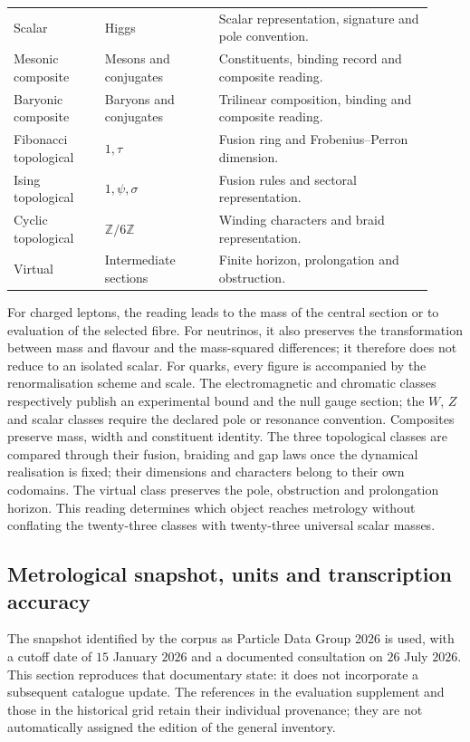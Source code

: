 \begin{longtable}{p{0.20\linewidth}p{0.25\linewidth}p{0.47\linewidth}}
Scalar & Higgs & Scalar representation, signature and pole convention.\\
Mesonic composite & Mesons and conjugates & Constituents, binding record and composite reading.\\
Baryonic composite & Baryons and conjugates & Trilinear composition, binding and composite reading.\\
Fibonacci topological & \(1,\tau\) & Fusion ring and Frobenius--Perron dimension.\\
Ising topological & \(1,\psi,\sigma\) & Fusion rules and sectoral representation.\\
Cyclic topological & \(\mathbb Z/6\mathbb Z\) & Winding characters and braid representation.\\
Virtual & Intermediate sections & Finite horizon, prolongation and obstruction.\\
\end{longtable}
\endgroup

For charged leptons, the reading leads to the mass of the central section
or to evaluation of the selected fibre. For neutrinos, it also preserves
the transformation between mass and flavour and the mass-squared differences; it therefore
does not reduce to an isolated scalar. For quarks, every figure is accompanied by the
renormalisation scheme and scale. The electromagnetic and
chromatic classes respectively publish an experimental bound and the null gauge
section; the \(W\), \(Z\) and scalar classes require the declared pole
or resonance convention. Composites preserve mass, width and constituent
identity. The three topological classes are compared through their
fusion, braiding and gap laws once the dynamical realisation is fixed;
their dimensions and characters belong to their own codomains. The virtual
class preserves the pole, obstruction and prolongation horizon. This
reading determines which object reaches metrology without conflating the
twenty-three classes with twenty-three universal scalar masses.

\subsection{Metrological snapshot, units and transcription accuracy}
\label{subsec:vi-corte-metrologico}

The snapshot identified by the corpus as Particle Data Group
2026 is used, with a cutoff date of \(15\) January \(2026\) and a documented
consultation on \(26\) July \(2026\). This section reproduces that
documentary state: it does not incorporate a subsequent catalogue update.
The references in the evaluation supplement and those in the historical grid
retain their individual provenance; they are not automatically assigned the edition
of the general inventory.

